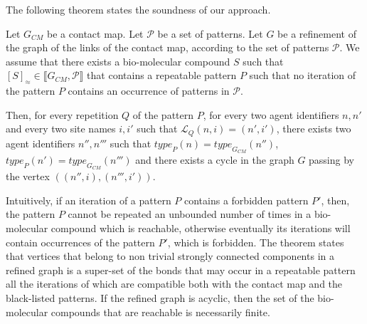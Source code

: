 \documentclass{entcs}
\newcommand{\graphsymb}{G}
\newcommand{\iso}{\approx}
\newcommand{\type}[1][\graphsymb]{\textit{type}_{#1}}
\newcommand{\links}[1][\graphsymb]{\mathcal{L}_{#1}}
\begin{document}
The following theorem states the soundness of our approach.
\begin{theorem}
  \label{th:linkbis}
  Let $\graphsymb_{\textit{CM}}$ be a contact map.
  Let $\mathcal{P}$ be a set of patterns.
  Let $G$ be a refinement of the graph of the links  of the contact map, according to the set of patterns $\mathcal{P}$. We assume that there exists a bio-molecular compound $S$ such that $[S]_{\iso} \in \llbracket \graphsymb_{\textit{CM}}, \mathcal{P}\rrbracket$ that contains a repeatable pattern $P$ such that no iteration of the pattern $P$  contains an occurrence of patterns in $\mathcal{P}$.

  Then, for every repetition $Q$ of the pattern $P$, for every two agent identifiers $n,n'$ and every two site names $i,i'$ such that $\links[Q](n,i)=(n',i')$, there exists two agent identifiers $n'',n'''$ such that $\type[P](n)=\type[\graphsymb_{\textit{CM}}](n'')$,
  $\type[P](n')=\type[\graphsymb_{\textit{CM}}](n''')$ and
  there exists a cycle in the graph $G$ passing by  the vertex $((n'',i),(n''',i'))$.
\end{theorem}

Intuitively, if an iteration of a pattern $P$ contains a forbidden pattern $P'$, then, the pattern $P$ cannot be repeated an unbounded number of times in a bio-molecular compound which is reachable, otherwise eventually its iterations will contain occurrences of the pattern $P'$, which is forbidden. The theorem states that vertices that belong to non trivial strongly connected components in a refined graph
is a super-set of the bonds that may occur in a repeatable pattern all the iterations of which are compatible both with the contact map and the black-listed patterns. If the refined graph is acyclic, then
the set of the bio-molecular compounds that are reachable is necessarily finite.
\end{document}
